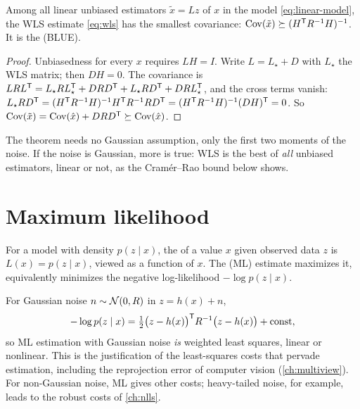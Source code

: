 \begin{theorem}
\label{thm:gauss-markov}
Among all linear unbiased estimators $\tilde x = Lz$ of $x$ in the model \eqref{eq:linear-model}, the WLS estimate \eqref{eq:wls} has the smallest
covariance: $\operatorname{Cov}(\tilde x) \succeq (H^{\mathsf{T}} R^{-1} H)^{-1}$. It is the  (BLUE).
\end{theorem}
\begin{proof}
Unbiasedness for every $x$ requires $LH = I$. Write $L = L_\star + D$ with $L_\star$ the WLS matrix; then $DH = 0$. The covariance is
$LRL^{\mathsf{T}} = L_\star RL_\star^{\mathsf{T}} + DRD^{\mathsf{T}} + L_\star RD^{\mathsf{T}} + DRL_\star^{\mathsf{T}}$, and the cross terms vanish:
$L_\star RD^{\mathsf{T}} = (H^{\mathsf{T}} R^{-1} H)^{-1} H^{\mathsf{T}} R^{-1} RD^{\mathsf{T}} = (H^{\mathsf{T}} R^{-1} H)^{-1}(DH)^{\mathsf{T}} = 0$. So $\operatorname{Cov}(\tilde x) = \operatorname{Cov}(\hat x) + DRD^{\mathsf{T}} \succeq \operatorname{Cov}(\hat x)$.
\end{proof}

The theorem needs no Gaussian assumption, only the first two moments of the noise. If the noise is Gaussian, more is true: WLS is the best of
\emph{all} unbiased estimators, linear or not, as the Cram\'er--Rao bound below shows.

\section{Maximum likelihood}

\begin{definition}[Likelihood]
For a model with density $p(z\mid x)$, the  of a value $x$ given observed data $z$ is $L(x) = p(z\mid x)$, viewed as a function of $x$.
The  (ML) estimate maximizes it, equivalently minimizes the negative log-likelihood $-\log p(z\mid x)$.
\end{definition}

For Gaussian noise $n \sim \mathcal{N}(0, R)$ in $z = h(x) + n$,
\begin{equation}
  -\log p(z\mid x) = \tfrac12\big(z - h(x)\big)^{\mathsf{T}} R^{-1}\big(z - h(x)\big) + \text{const},
\end{equation}
so ML estimation with Gaussian noise \emph{is} weighted least squares, linear or nonlinear. This is the justification of the least-squares
costs that pervade estimation, including the reprojection error of computer vision (\cref{ch:multiview}). For non-Gaussian noise, ML gives
other costs; heavy-tailed noise, for example, leads to the robust costs of \cref{ch:nlls}.

